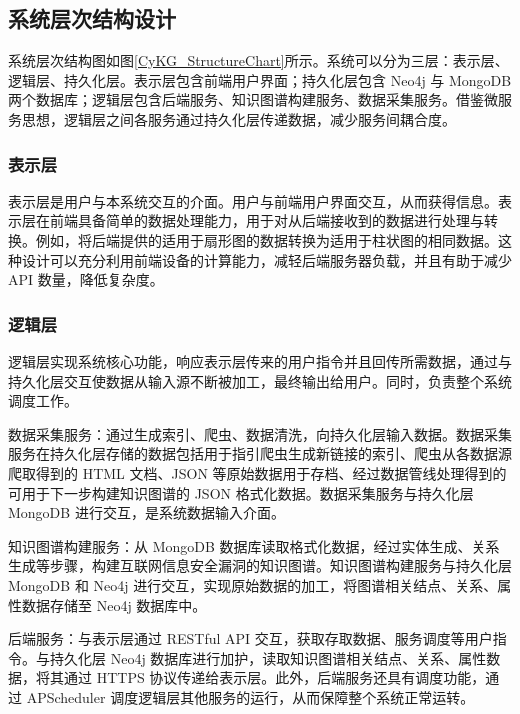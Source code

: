 \documentclass[a4paper,AutoFakeBold,oneside,12pt]{book}
\begin{document}
\subsection{系统层次结构设计}

系统层次结构图如图\ref{CyKG_StructureChart}所示。系统可以分为三层：表示层、逻辑层、持久化层。表示层包含前端用户界面；持久化层包含 Neo4j 与 MongoDB 两个数据库；逻辑层包含后端服务、知识图谱构建服务、数据采集服务。借鉴微服务思想，逻辑层之间各服务通过持久化层传递数据，减少服务间耦合度。


\subsubsection{表示层}

表示层是用户与本系统交互的介面。用户与前端用户界面交互，从而获得信息。表示层在前端具备简单的数据处理能力，用于对从后端接收到的数据进行处理与转换。例如，将后端提供的适用于扇形图的数据转换为适用于柱状图的相同数据。这种设计可以充分利用前端设备的计算能力，减轻后端服务器负载，并且有助于减少 API 数量，降低复杂度。

\subsubsection{逻辑层}

逻辑层实现系统核心功能，响应表示层传来的用户指令并且回传所需数据，通过与持久化层交互使数据从输入源不断被加工，最终输出给用户。同时，负责整个系统调度工作。

数据采集服务：通过生成索引、爬虫、数据清洗，向持久化层输入数据。数据采集服务在持久化层存储的数据包括用于指引爬虫生成新链接的索引、爬虫从各数据源爬取得到的 HTML 文档、JSON 等原始数据用于存档、经过数据管线处理得到的可用于下一步构建知识图谱的 JSON 格式化数据。数据采集服务与持久化层 MongoDB 进行交互，是系统数据输入介面。

知识图谱构建服务：从 MongoDB 数据库读取格式化数据，经过实体生成、关系生成等步骤，构建互联网信息安全漏洞的知识图谱。知识图谱构建服务与持久化层 MongoDB 和 Neo4j 进行交互，实现原始数据的加工，将图谱相关结点、关系、属性数据存储至 Neo4j 数据库中。

后端服务：与表示层通过 RESTful API 交互，获取存取数据、服务调度等用户指令。与持久化层 Neo4j 数据库进行加护，读取知识图谱相关结点、关系、属性数据，将其通过 HTTPS 协议传递给表示层。此外，后端服务还具有调度功能，通过 APScheduler 调度逻辑层其他服务的运行，从而保障整个系统正常运转。
\end{document}
